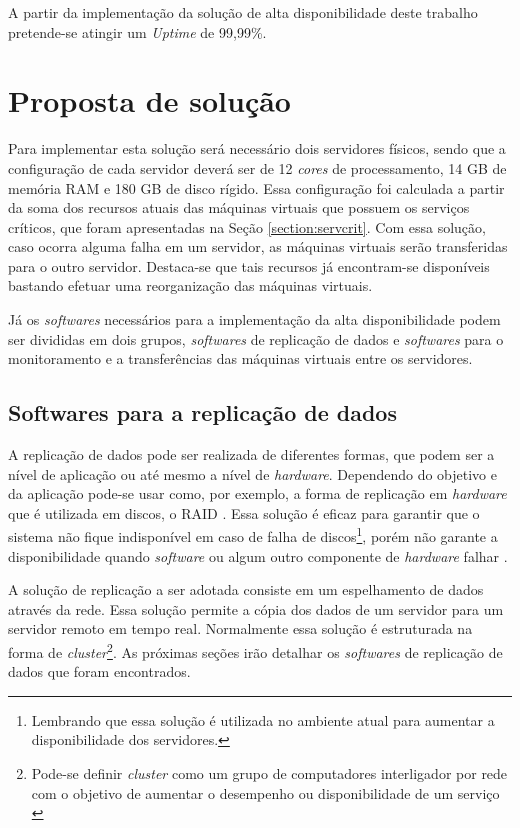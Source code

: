 A partir da implementação da solução de alta disponibilidade deste trabalho pretende-se atingir um \textit{Uptime} de 99,99\%.

\section{Proposta de solução}
\label{section:propostasolucao}

Para implementar esta solução será necessário dois servidores físicos, sendo que a configuração de cada servidor deverá ser de 
12 \textit{cores} de processamento, 14 GB de memória \ac{RAM} e 180 GB de disco rígido. Essa configuração foi calculada a partir da soma dos 
recursos atuais das máquinas virtuais que possuem os serviços críticos, que foram apresentadas na Seção \ref{section:servcrit}.
Com essa solução, caso ocorra alguma falha em um servidor, as máquinas virtuais serão transferidas para o outro servidor.
Destaca-se que tais recursos já encontram-se disponíveis bastando efetuar uma reorganização das máquinas virtuais.

Já os \textit{softwares} necessários para a implementação da alta disponibilidade podem ser divididas em dois grupos, \textit{softwares} de 
replicação de dados e \textit{softwares} para o monitoramento e a transferências das máquinas virtuais entre os servidores.

\subsection{Softwares para a replicação de dados}
\label{section:toolrepl}

A replicação de dados pode ser realizada de diferentes formas, que podem ser a nível de aplicação ou até mesmo a nível de \textit{hardware}.
Dependendo do objetivo e da aplicação pode-se usar como, por exemplo, a forma de replicação em \textit{hardware} que é utilizada em discos, o 
\ac{RAID} \cite{raid}. Essa solução é eficaz para garantir que o sistema não fique indisponível em caso de falha de discos\footnote[2]{Lembrando 
que essa solução é utilizada no ambiente atual para aumentar a disponibilidade dos servidores.}, porém não garante a disponibilidade quando 
\textit{software} ou algum outro componente de \textit{hardware} falhar \cite{zaminhani2008}.

A solução de replicação a ser adotada consiste em um espelhamento de dados através da rede. Essa solução permite a cópia dos dados de um servidor
para um servidor remoto em tempo real. Normalmente essa solução é estruturada na forma de \textit{cluster}\footnote[3]{Pode-se definir 
\textit{cluster} como um grupo de computadores interligador por rede com o objetivo de aumentar o desempenho ou disponibilidade de um serviço 
\cite{freitas2005}}.
As próximas seções irão detalhar os \textit{softwares} de replicação de dados que foram encontrados.

